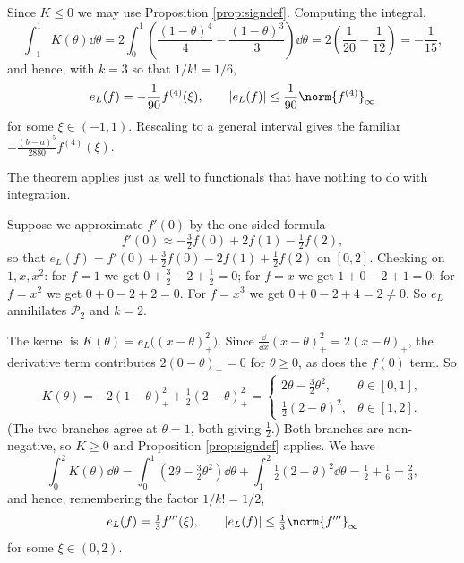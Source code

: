 \documentclass[a4paper]{scrartcl}
\providecommand{\abs}[1]{\left\lvert#1\right\rvert}
\renewcommand{\abs}[1]{\left\lvert#1\right\rvert}
\newcommand{\Pn}[1]{\mathcal{P}_{#1}}
\begin{document}
\begin{center}
\end{center}

Since $K \le 0$ we may use Proposition \ref{prop:signdef}. Computing the integral,
$$
\int_{-1}^{1}K(\theta)\dd\theta = 2\int_0^1\left(\frac{(1-\theta)^4}{4} - \frac{(1-\theta)^3}{3}\right)\dd\theta = 2\left(\frac{1}{20} - \frac{1}{12}\right) = -\frac{1}{15},
$$
and hence, with $k = 3$ so that $1/k! = 1/6$,
$$
e_L(f) = -\frac{1}{90}f^{(4)}(\xi), \qquad \abs{e_L(f)} \leq \frac{1}{90}\norm{f^{(4)}}_\infty
$$
for some $\xi \in (-1,1)$. Rescaling to a general interval gives the familiar $-\frac{(b-a)^5}{2880}f^{(4)}(\xi)$.

The theorem applies just as well to functionals that have nothing to do with integration.

\begin{example}
  Suppose we approximate $f'(0)$ by the one-sided formula
  $$
  f'(0) \approx -\tfrac32 f(0) + 2f(1) - \tfrac12 f(2),
  $$
  so that $e_L(f) = f'(0) + \tfrac32 f(0) - 2f(1) + \tfrac12 f(2)$ on $[0,2]$. Checking on $1, x, x^2$: for $f = 1$ we get $0 + \tfrac32 - 2 + \tfrac12 = 0$; for $f = x$ we get $1 + 0 - 2 + 1 = 0$; for $f = x^2$ we get $0 + 0 - 2 + 2 = 0$. For $f = x^3$ we get $0 + 0 - 2 + 4 = 2 \neq 0$. So $e_L$ annihilates $\Pn{2}$ and $k = 2$.

  The kernel is $K(\theta) = e_L\big((x-\theta)_+^2\big)$. Since $\tfrac{\dd}{\dd x}(x-\theta)_+^2 = 2(x-\theta)_+$, the derivative term contributes $2(0-\theta)_+ = 0$ for $\theta \ge 0$, as does the $f(0)$ term. So
  $$
  K(\theta) = -2(1-\theta)_+^2 + \tfrac12(2-\theta)_+^2 = \begin{cases} 2\theta - \tfrac32\theta^2, & \theta \in [0,1],\\[1ex] \tfrac12(2-\theta)^2, & \theta \in [1,2].\end{cases}
  $$
  (The two branches agree at $\theta = 1$, both giving $\tfrac12$.) Both branches are non-negative, so $K \geq 0$ and Proposition \ref{prop:signdef} applies. We have
  $$
  \int_0^2 K(\theta)\dd\theta = \int_0^1\left(2\theta - \tfrac32\theta^2\right)\dd\theta + \int_1^2 \tfrac12(2-\theta)^2\dd\theta = \tfrac12 + \tfrac16 = \tfrac23,
  $$
  and hence, remembering the factor $1/k! = 1/2$,
  $$
  e_L(f) = \tfrac13 f'''(\xi), \qquad \abs{e_L(f)} \leq \tfrac13\norm{f'''}_\infty
  $$
  for some $\xi \in (0,2)$.
\end{example}
\end{document}
